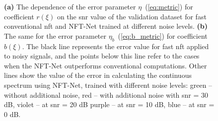 \begin{figure}[tp]
\caption{\textbf{(a)} The dependence of the error parameter $\eta$~(\ref{eq:metric}) for coefficient $r(\xi)$ on the \acrshort{snr} value of the validation dataset for fast conventional \acrshort{nft} and NFT-Net trained at different noise levels. \textbf{(b)} The same for the error parameter $\eta_b$~(\ref{eq:b_metric}) for coefficient $b(\xi)$. The black line represents the error value for fast \acrshort{nft} applied to noisy signals, and the points below this line refer to the cases when the NFT-Net outperforms conventional computations. Other lines show  the value of the error in calculating the continuous spectrum using NFT-Net, trained with different noise levels: green -- without additional noise, red -- with additional noise with \acrshort{snr} = 30 dB, violet -- at \acrshort{snr} = 20 dB purple -- at \acrshort{snr} = 10 dB, blue -- at \acrshort{snr} = 0 dB.}
\label{fig:quality_r_b}
\end{figure}